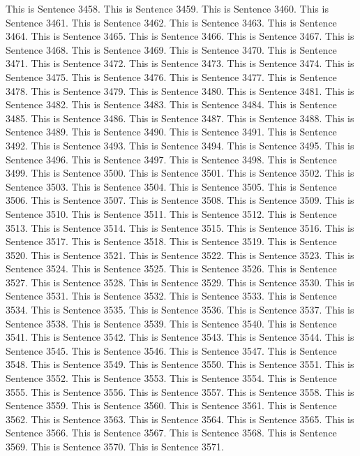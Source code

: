 \documentclass{article}
\begin{document}
This is Sentence 3458.
This is Sentence 3459.
This is Sentence 3460.
This is Sentence 3461.
This is Sentence 3462.
This is Sentence 3463.
This is Sentence 3464.
This is Sentence 3465.
This is Sentence 3466.
This is Sentence 3467.
This is Sentence 3468.
This is Sentence 3469.
This is Sentence 3470.
This is Sentence 3471.
This is Sentence 3472.
This is Sentence 3473.
This is Sentence 3474.
This is Sentence 3475.
This is Sentence 3476.
This is Sentence 3477.
This is Sentence 3478.
This is Sentence 3479.
This is Sentence 3480.
This is Sentence 3481.
This is Sentence 3482.
This is Sentence 3483.
This is Sentence 3484.
This is Sentence 3485.
This is Sentence 3486.
This is Sentence 3487.
This is Sentence 3488.
This is Sentence 3489.
This is Sentence 3490.
This is Sentence 3491.
This is Sentence 3492.
This is Sentence 3493.
This is Sentence 3494.
This is Sentence 3495.
This is Sentence 3496.
This is Sentence 3497.
This is Sentence 3498.
This is Sentence 3499.
This is Sentence 3500.
This is Sentence 3501.
This is Sentence 3502.
This is Sentence 3503.
This is Sentence 3504.
This is Sentence 3505.
This is Sentence 3506.
This is Sentence 3507.
This is Sentence 3508.
This is Sentence 3509.
This is Sentence 3510.
This is Sentence 3511.
This is Sentence 3512.
This is Sentence 3513.
This is Sentence 3514.
This is Sentence 3515.
This is Sentence 3516.
This is Sentence 3517.
This is Sentence 3518.
This is Sentence 3519.
This is Sentence 3520.
This is Sentence 3521.
This is Sentence 3522.
This is Sentence 3523.
This is Sentence 3524.
This is Sentence 3525.
This is Sentence 3526.
This is Sentence 3527.
This is Sentence 3528.
This is Sentence 3529.
This is Sentence 3530.
This is Sentence 3531.
This is Sentence 3532.
This is Sentence 3533.
This is Sentence 3534.
This is Sentence 3535.
This is Sentence 3536.
This is Sentence 3537.
This is Sentence 3538.
This is Sentence 3539.
This is Sentence 3540.
This is Sentence 3541.
This is Sentence 3542.
This is Sentence 3543.
This is Sentence 3544.
This is Sentence 3545.
This is Sentence 3546.
This is Sentence 3547.
This is Sentence 3548.
This is Sentence 3549.
This is Sentence 3550.
This is Sentence 3551.
This is Sentence 3552.
This is Sentence 3553.
This is Sentence 3554.
This is Sentence 3555.
This is Sentence 3556.
This is Sentence 3557.
This is Sentence 3558.
This is Sentence 3559.
This is Sentence 3560.
This is Sentence 3561.
This is Sentence 3562.
This is Sentence 3563.
This is Sentence 3564.
This is Sentence 3565.
This is Sentence 3566.
This is Sentence 3567.
This is Sentence 3568.
This is Sentence 3569.
This is Sentence 3570.
This is Sentence 3571.
\end{document}
